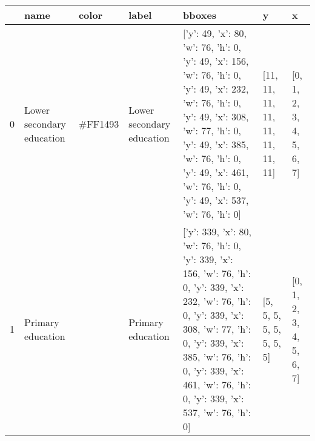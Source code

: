 \begin{tabular}{lllllll}
\toprule
 & name & color & label & bboxes & y & x \\
\midrule
0 & Lower secondary education & #FF1493 & Lower secondary education & [{'y': 49, 'x': 80, 'w': 76, 'h': 0}, {'y': 49, 'x': 156, 'w': 76, 'h': 0}, {'y': 49, 'x': 232, 'w': 76, 'h': 0}, {'y': 49, 'x': 308, 'w': 77, 'h': 0}, {'y': 49, 'x': 385, 'w': 76, 'h': 0}, {'y': 49, 'x': 461, 'w': 76, 'h': 0}, {'y': 49, 'x': 537, 'w': 76, 'h': 0}] & [11, 11, 11, 11, 11, 11, 11, 11] & [0, 1, 2, 3, 4, 5, 6, 7] \\
1 & Primary education & #00FFFF & Primary education & [{'y': 339, 'x': 80, 'w': 76, 'h': 0}, {'y': 339, 'x': 156, 'w': 76, 'h': 0}, {'y': 339, 'x': 232, 'w': 76, 'h': 0}, {'y': 339, 'x': 308, 'w': 77, 'h': 0}, {'y': 339, 'x': 385, 'w': 76, 'h': 0}, {'y': 339, 'x': 461, 'w': 76, 'h': 0}, {'y': 339, 'x': 537, 'w': 76, 'h': 0}] & [5, 5, 5, 5, 5, 5, 5, 5] & [0, 1, 2, 3, 4, 5, 6, 7] \\
\bottomrule
\end{tabular}
